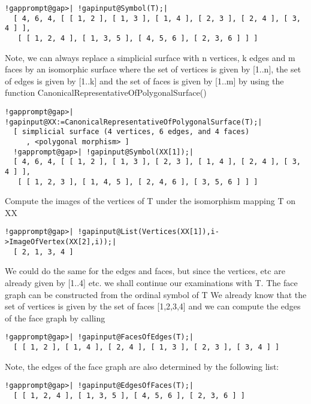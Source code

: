 \documentclass[a4paper,11pt]{report}
\begin{document}
{{{ 
\begin{Verbatim}[commandchars=!@|,fontsize=\small,frame=single,label=Example]
  !gapprompt@gap>| !gapinput@Symbol(T);|
  [ 4, 6, 4, [ [ 1, 2 ], [ 1, 3 ], [ 1, 4 ], [ 2, 3 ], [ 2, 4 ], [ 3, 4 ] ], 
   [ [ 1, 2, 4 ], [ 1, 3, 5 ], [ 4, 5, 6 ], [ 2, 3, 6 ] ] ]
\end{Verbatim}
 

 Note, we can always replace a simplicial surface with n vertices, k edges and
m faces by an isomorphic surface where the set of vertices is given by [1..n],
the set of edges is given by [1..k] and the set of faces is given by [1..m] by
using the function CanonicalRepresentativeOfPolygonalSurface() 

 
\begin{Verbatim}[commandchars=!@|,fontsize=\small,frame=single,label=Example]
  !gapprompt@gap>| !gapinput@XX:=CanonicalRepresentativeOfPolygonalSurface(T);|
  [ simplicial surface (4 vertices, 6 edges, and 4 faces)
     , <polygonal morphism> ]
  !gapprompt@gap>| !gapinput@Symbol(XX[1]);|
  [ 4, 6, 4, [ [ 1, 2 ], [ 1, 3 ], [ 2, 3 ], [ 1, 4 ], [ 2, 4 ], [ 3, 4 ] ], 
   [ [ 1, 2, 3 ], [ 1, 4, 5 ], [ 2, 4, 6 ], [ 3, 5, 6 ] ] ]
\end{Verbatim}
 

 Compute the images of the vertices of T under the isomorphism mapping T on XX 

 
\begin{Verbatim}[commandchars=!@|,fontsize=\small,frame=single,label=Example]
  !gapprompt@gap>| !gapinput@List(Vertices(XX[1]),i->ImageOfVertex(XX[2],i));|
  [ 2, 1, 3, 4 ]
\end{Verbatim}
 

 We could do the same for the edges and faces, but since the vertices, etc are
already given by [1..4] etc. we shall continue our examinations with T. The
face graph can be constructed from the ordinal symbol of T We already know
that the set of vertices is given by the set of faces [1,2,3,4] and we can
compute the edges of the face graph by calling 

 
\begin{Verbatim}[commandchars=!@|,fontsize=\small,frame=single,label=Example]
  !gapprompt@gap>| !gapinput@FacesOfEdges(T);|
  [ [ 1, 2 ], [ 1, 4 ], [ 2, 4 ], [ 1, 3 ], [ 2, 3 ], [ 3, 4 ] ]
\end{Verbatim}
 

 Note, the edges of the face graph are also determined by the following list: 

 
\begin{Verbatim}[commandchars=!@|,fontsize=\small,frame=single,label=Example]
  !gapprompt@gap>| !gapinput@EdgesOfFaces(T);|
  [ [ 1, 2, 4 ], [ 1, 3, 5 ], [ 4, 5, 6 ], [ 2, 3, 6 ] ]
\end{Verbatim}
 

}}}
\end{document}
